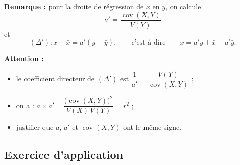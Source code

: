 \documentclass[11pt,a4paper]{article}
\begin{document}
\textbf{Remarque :} pour la droite de régression de $x$ en $y$, on calcule
\[
  a' = \frac{\operatorname{cov}(X,Y)}{V(Y)}
\]
et
\[
  (\Delta') : x - \bar{x} = a'(y - \bar{y}),
  \qquad\text{c'est-à-dire}\qquad
  x = a'y + \bar{x} - a'\bar{y} .
\]

\textbf{Attention :}
\begin{itemize}
  \item le coefficient directeur de $(\Delta')$ est
        $\dfrac{1}{a'} = \dfrac{V(Y)}{\operatorname{cov}(X,Y)}$ ;
  \item on a :
        $a \times a' = \dfrac{\bigl(\operatorname{cov}(X,Y)\bigr)^2}{V(X)\,V(Y)} = r^2$ ;
  \item justifier que $a$, $a'$ et $\operatorname{cov}(X,Y)$ ont le même signe.
\end{itemize}

\subsection{Exercice d'application}
\end{document}
